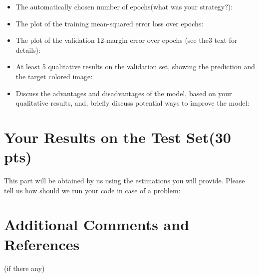 \documentclass[12pt]{article}
\begin{document}
    \begin{itemize}
        \item The automatically chosen number of epochs(what was your strategy?):
        \item The plot of the training mean-squared error loss over epochs:
        \item The  plot  of  the  validation  12-margin  error  over  epochs (see the3 text for details):
        \item At least 5 qualitative results on the validation set, showing the prediction and the target colored image:
        \item Discuss the advantages and disadvantages of the model, based on your qualitative results, and, briefly discuss potential ways to improve the model:
    \end{itemize}
    
\section{Your Results on the Test Set(30 pts)}
This part will be obtained by us using the estimations you will provide. Please tell us how should we run your code in case of a problem:

\section{Additional Comments and References}

    (if there any)
\end{document}
